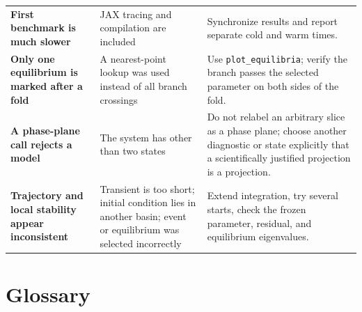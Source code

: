 \documentclass[11pt,oneside]{book}
\begin{document}
\begin{longtable}{>{\bfseries}p{}p{}p{}}
\addlinespace
First benchmark is much slower &
JAX tracing and compilation are included &
Synchronize results and report separate cold and warm times.\\
\addlinespace
Only one equilibrium is marked after a fold &
A nearest-point lookup was used instead of all branch crossings &
Use \texttt{plot\_equilibria}; verify the branch passes the selected parameter
on both sides of the fold.\\
\addlinespace
A phase-plane call rejects a model &
The system has other than two states &
Do not relabel an arbitrary slice as a phase plane; choose another diagnostic
or state explicitly that a scientifically justified projection is a projection.\\
\addlinespace
Trajectory and local stability appear inconsistent &
Transient is too short; initial condition lies in another basin; event or
equilibrium was selected incorrectly &
Extend integration, try several starts, check the frozen parameter, residual,
and equilibrium eigenvalues.\\
\bottomrule
\end{longtable}
\normalsize

\chapter{Glossary}
\end{document}
